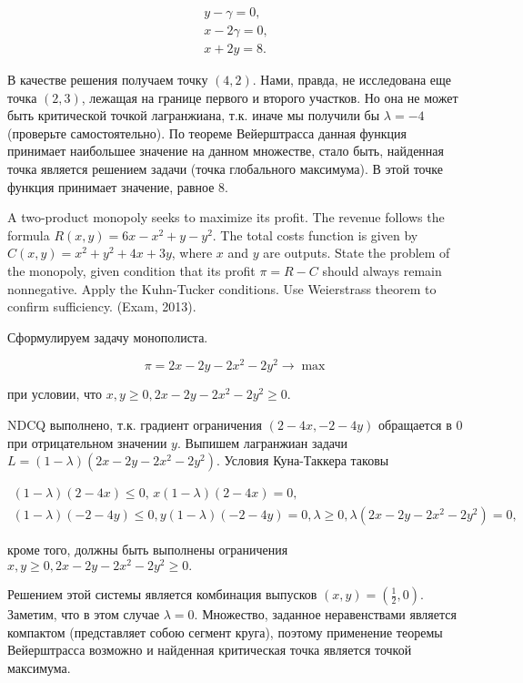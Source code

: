 \begin{solution}
\[\begin{array}{l} {y-\gamma =0,} \\ {x-2\gamma =0,} \\ {x+2y=8.} \end{array}\] 

В качестве решения получаем точку $(4,2)$. Нами, правда, не исследована еще точка $(2,3)$, лежащая на границе первого и второго участков. Но она не может быть критической точкой лагранжиана, т.к. иначе мы получили бы $\lambda =-4$ (проверьте самостоятельно). По теореме Вейерштрасса данная функция принимает наибольшее значение на данном множестве, стало быть, найденная точка является решением задачи (точка глобального максимума). В этой точке функция принимает значение, равное 8.
\end{solution}

\begin{problem} 
A two-product monopoly seeks to maximize its profit. The revenue follows the formula $R(x,y)=6x-x^{2} +y-y^{2} $. The total costs function is given by $C(x,y)=x^{2} +y^{2} +4x+3y$, where $x$ and $y$ are outputs. State the problem of the monopoly, given condition that its profit $\pi =R-C$ should always remain nonnegative. Apply the Kuhn-Tucker conditions. Use Weierstrass theorem to confirm sufficiency. (Exam, 2013).
\end{problem}

\begin{solution}
Сформулируем задачу монополиста.

\[\pi =2x-2y-2x^{2} -2y^{2} \to \max \] 

при условии, что $x,y\ge 0,  2x-2y-2x^{2} -2y^{2} \ge 0.$

NDCQ выполнено, т.к. градиент ограничения $(2-4x,-2-4y)$ обращается в 0 при отрицательном значении $y$. Выпишем лагранжиан задачи $L=(1-\lambda )(2x-2y-2x^{2} -2y^{2} )$. Условия Куна-Таккера таковы

\[\begin{array}{l} {(1-\lambda )(2-4x)\le 0,\, x(1-\lambda )(2-4x)=0,} \\ {(1-\lambda )(-2-4y)\le 0,  y(1-\lambda )(-2-4y)=0,  \lambda \ge 0,  \lambda (2x-2y-2x^{2} -2y^{2} )=0,} \end{array}\] 

кроме того, должны быть выполнены ограничения $x,y\ge 0,  2x-2y-2x^{2} -2y^{2} \ge 0.$

Решением этой системы является комбинация выпусков $(x,y)=(\frac{1}{2} ,0)$. Заметим, что в этом случае $\lambda =0$. Множество, заданное неравенствами является компактом (представляет собою сегмент круга), поэтому применение теоремы Вейерштрасса возможно и найденная критическая точка является точкой максимума.
\end{solution}

